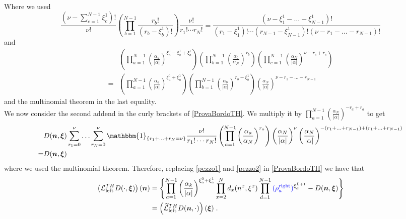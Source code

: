 \documentclass[10pt]{article}
\numberwithin{equation}{section}
\numberwithin{equation}{subsection}
\newcommand{\dt}{\;.}
\newcommand{\fra}[1]{\textcolor[rgb]{0,0,1}{#1}}
\begin{document}
{\begin{align}
\end{align}
Where we used 
\begin{equation*}
\frac{\left(\nu-\sum_{c=1}^{N-1}\xi_{c}^{1}\right)!}{\nu!}\left(\prod_{b=1}^{N-1}\frac{r_{b}!}{(r_{b}-\xi^{1}_{b})!}\right)\frac{\nu!}{r_{1}!\cdots r_{N}!}=\frac{\left(\nu-\xi_{1}^{1}-\ldots-\xi_{N-1}^{1}\right)!}{(r_{1}-\xi_{1}^{1})!\cdots(r_{N-1}-\xi_{N-1}^{1})!(\nu-r_{1}-\ldots-r_{N-1})!}
\end{equation*}
and 
\begin{align*}
&\left(\prod_{a=1}^{N-1}\left(\frac{\alpha_{a}}{|\alpha|}\right)^{\xi_{a}^{0}-\xi_{a}^{1}+\xi_{a}^{1}}\right)\left(\prod_{b=1}^{N-1}\left(\frac{\alpha_{b}}{\alpha_{N}}\right)^{r_{b}}\right)\left(\prod_{c=1}^{N-1}\left(\frac{\alpha_{N}}{|\alpha|}\right)^{\nu-r_{c}+r_{c}}\right)\\=&	\left(\prod_{a=1}^{N-1}\left(\frac{\alpha_{a}}{|\alpha|}\right)^{\xi_{a}^{0}+\xi_{a}^{1}}\right)\left(\prod_{b=1}^{N-1}\left(\frac{\alpha_{b}}{|\alpha|}\right)^{r_{b}-\xi_{b}^{1}}\right)\left(\frac{\alpha_{N}}{|\alpha|}\right)^{\nu-r_{1}-\ldots-r_{N-1}}
\end{align*}
and the multinomial theorem in the last equality. \\ We now consider the second addend in the curly brackets of \eqref{ProvaBordoTH}.
We \fra{multiply} it by $\prod_{a=1}^{N-1}\left(\frac{\alpha_{N}}{|\alpha|}\right)^{-r_{a}+r_{a}}$ to get
\begin{equation}\label{pezzo2}
	\begin{split}
		&D(\bm{n},\bm{\xi})\sum_{r_{1}=0}^{\nu}\ldots\sum_{r_{N}=0}^{\nu}\mathbbm{1}_{\{r_{1}+\ldots+r_{N}=\nu\}}\frac{\nu!}{r_{1}!\cdots r_{N}!}\left(\prod_{a=1}^{N-1}\left(\frac{\alpha_{a}}{\alpha_{N}}\right)^{r_{a}}\right)\left(\frac{\alpha_{N}}{|\alpha|}\right)^{\nu}\left(\frac{\alpha_{N}}{|\alpha|}\right)^{-(r_{1}+\ldots+r_{N-1})+(r_{1}+\ldots+r_{N-1})}\\=&D(\bm{n},\bm{\xi})
	\end{split}
\end{equation} 
where we used the multinomial theorem. Therefore, replacing \eqref{pezzo1} and \eqref{pezzo2} in \eqref{ProvaBordoTH} we have that
\begin{align}
	\left(\mathcal{L}_{\text{left}}^{TH}D(\cdot,\bm{\xi})\right)(\bm{n})&=\left\{\prod_{a=1}^{N-1}\left(\frac{\alpha_{k}}{|\alpha|}\right)^{\xi_{a}^{0}+\xi_{a}^{1}}\prod_{x=2}^{N}d_{x}(n^{x},\xi^{x})\prod_{d=1}^{N-1}\fra{(\rho_{a}^{\text{right}})}^{\xi_{d}^{L+1}}-D(\bm{n},\bm{\xi})\right\}
	\\&=
	\left(\widetilde{\mathcal{L}}_{\text{left}}^{TH}D(\bm{n},\cdot)\right)(\bm{\xi})\dt
\end{align}

}
\end{document}
